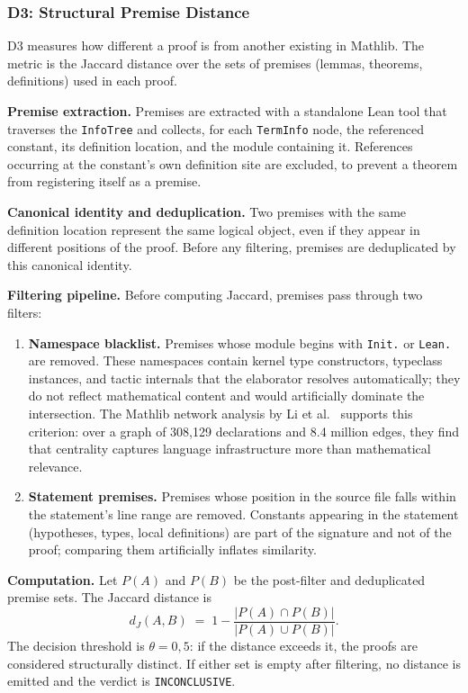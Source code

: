 \documentclass[12pt,a4paper]{article}
\theoremstyle{remark}
\begin{document}
\subsubsection{D3: Structural Premise Distance}

D3 measures how different a proof is from another existing in Mathlib. The metric is the Jaccard distance over the sets of premises (lemmas, theorems, definitions) used in each proof.

\textbf{Premise extraction.} Premises are extracted with a standalone Lean tool that traverses the \texttt{InfoTree} and collects, for each \texttt{TermInfo} node, the referenced constant, its definition location, and the module containing it. References occurring at the constant's own definition site are excluded, to prevent a theorem from registering itself as a premise.

\textbf{Canonical identity and deduplication.} Two premises with the same definition location represent the same logical object, even if they appear in different positions of the proof. Before any filtering, premises are deduplicated by this canonical identity.

\textbf{Filtering pipeline.} Before computing Jaccard, premises pass through two filters:

\begin{enumerate}
\item \textbf{Namespace blacklist.} Premises whose module begins with \texttt{Init.} or \texttt{Lean.} are removed. These namespaces contain kernel type constructors, typeclass instances, and tactic internals that the elaborator resolves automatically; they do not reflect mathematical content and would artificially dominate the intersection. The Mathlib network analysis by Li et al.~\cite{network2026} supports this criterion: over a graph of 308,129 declarations and 8.4 million edges, they find that centrality captures language infrastructure more than mathematical relevance.

\item \textbf{Statement premises.} Premises whose position in the source file falls within the statement's line range are removed. Constants appearing in the statement (hypotheses, types, local definitions) are part of the signature and not of the proof; comparing them artificially inflates similarity.
\end{enumerate}

\textbf{Computation.} Let $P(A)$ and $P(B)$ be the post-filter and deduplicated premise sets. The Jaccard distance is
\[
d_J(A,B) \;=\; 1 - \frac{|P(A) \cap P(B)|}{|P(A) \cup P(B)|}.
\]
The decision threshold is $\theta = 0{,}5$: if the distance exceeds it, the proofs are considered structurally distinct. If either set is empty after filtering, no distance is emitted and the verdict is \texttt{INCONCLUSIVE}.
\end{document}
